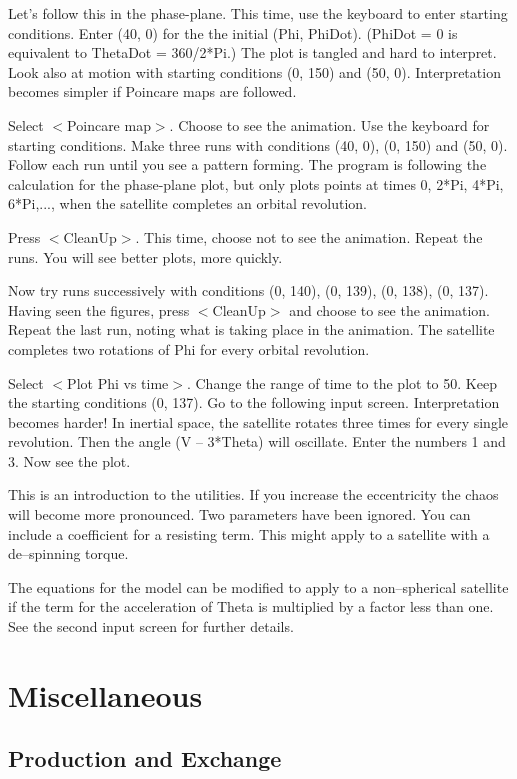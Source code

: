    Let's follow this in the phase-plane. This time, use the keyboard to
enter starting conditions. Enter (40, 0) for the the initial (Phi, PhiDot).
(PhiDot = 0 is equivalent to ThetaDot = 360/2*Pi.) The plot is tangled and
hard to interpret. Look also at motion with starting conditions (0, 150)
and (50, 0). Interpretation becomes simpler if Poincare maps are followed.

   Select $<$Poincare map$>$. Choose to see the animation. Use the keyboard
for starting conditions. Make three runs with conditions (40, 0), (0, 150)
and (50, 0). Follow each run until you see a pattern forming. The program
is following the calculation for the phase-plane plot, but only plots
points at times 0, 2*Pi, 4*Pi, 6*Pi,..., when the satellite completes
an orbital revolution.

   Press $<$CleanUp$>$. This time, choose not to see the animation. Repeat
the runs. You will see better plots, more quickly.

   Now try runs successively with conditions (0, 140), (0, 139),
(0, 138), (0, 137). Having seen the figures, press $<$CleanUp$>$ and choose
to see the animation. Repeat the last run, noting what is taking place
in the animation. The satellite completes two rotations of Phi
for every orbital revolution.

   Select $<$Plot Phi vs time$>$. Change the range of time to the plot to 50.
Keep the starting conditions (0, 137). Go to the following input screen.
Interpretation becomes harder! In inertial space, the satellite rotates
three times for every single revolution. Then the angle (V -- 3*Theta)
will oscillate. Enter the numbers 1 and 3. Now see the plot.

   This is an introduction to the utilities. If you increase the
eccentricity the chaos will become more pronounced. Two parameters
have been ignored. You can include a coefficient for a resisting term.
This might apply to a satellite with a de--spinning torque.

   The equations for the model can be modified to apply to a non--spherical
satellite if the term for the acceleration of Theta is multiplied by a
factor less than one. See the second input screen for further details.



\section{Miscellaneous}


\subsection{Production and Exchange}


